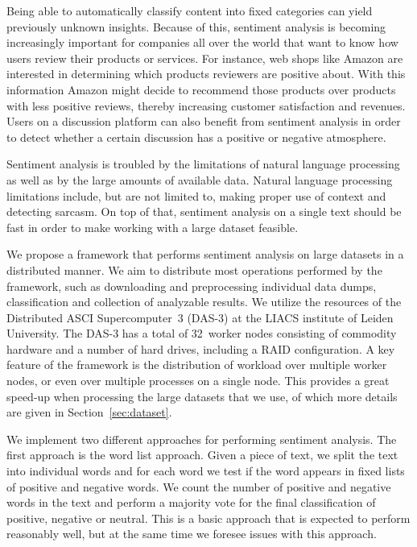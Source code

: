 \documentclass{article}
\begin{document}
Being able to automatically classify content into fixed categories can yield
previously unknown insights. Because of this, sentiment analysis is becoming
increasingly important for companies all over the world that want to know how
users review their products or services. For instance, web shops like Amazon
are interested in determining which products reviewers are positive about.
With this information Amazon might decide to recommend those products over
products with less positive reviews, thereby increasing customer satisfaction
and revenues. Users on a discussion platform can also benefit from sentiment 
analysis in order to detect whether a certain discussion has a positive or 
negative atmosphere.

Sentiment analysis is troubled by the limitations of natural language processing
as well as by the large amounts of available data. Natural language processing
limitations include, but are not limited to, making proper use of context and
detecting sarcasm. On top of that, sentiment analysis on a single text should be
fast in order to make working with a large dataset feasible.

We propose a framework that performs sentiment analysis on large datasets in a
distributed manner. We aim to distribute most operations performed by the 
framework, such as downloading and preprocessing individual data dumps,
classification and collection of analyzable results. We utilize the resources 
of the Distributed ASCI Supercomputer~3 (DAS-3) at the LIACS institute of 
Leiden University. The DAS-3 has a total of 32~worker nodes consisting of 
commodity hardware and a number of hard drives, including a RAID configuration. 
A key feature of the framework is the distribution of workload over multiple 
worker nodes, or even over multiple processes on a single node. This provides 
a great speed-up when processing the large datasets that we use, of which more 
details are given in Section~\ref{sec:dataset}.

We implement two different approaches for performing sentiment analysis. The
first approach is the word list approach. Given a piece of text, we split the 
text into individual words and for each word we test if the word appears in 
fixed lists of positive and negative words. We count the number of positive and 
negative words in the text and perform a majority vote for the final 
classification of positive, negative or neutral. This is a basic approach that 
is expected to perform reasonably well, but at the same time we foresee issues 
with this approach.
\end{document}
